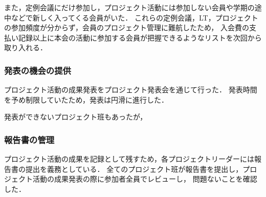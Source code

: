 また，定例会議にだけ参加し，プロジェクト活動には参加しない会員や学期の途中などで新しく入ってくる会員がいた．
これらの定例会議，LT，プロジェクトの参加頻度が分からず，会員のプロジェクト管理に難航したため，
入会費の支払い記録以上に本会の活動に参加する会員が把握できるようなリストを次回から取り入れる．

\subsubsection*{発表の機会の提供}

プロジェクト活動の成果発表をプロジェクト発表会を通じて行った．
発表時間を予め制限していたため，発表は円滑に進行した．

発表ができないプロジェクト班もあったが，

\subsubsection*{報告書の管理}

プロジェクト活動の成果を記録として残すため，各プロジェクトリーダーには報告書の提出を義務としている．
全てのプロジェクト班が報告書を提出し，プロジェクト活動の成果発表の際に参加者全員でレビューし，
問題ないことを確認した．
